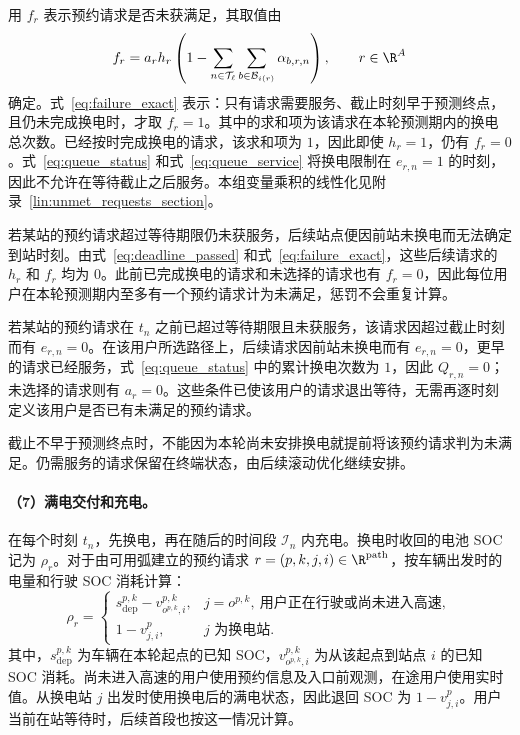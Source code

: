 用 $f_r$ 表示预约请求是否未获满足，其取值由
\begin{equation}
f_r=a_rh_r\left(
1-\sum_{n\in\mathcal T_\ell}
\sum_{b\in\mathcal B_{i(r)}}\alpha_{b,r,n}
\right),\qquad r\in\R^A
\label{eq:failure_exact}
\end{equation}
确定。式~\eqref{eq:failure_exact} 表示：只有请求需要服务、截止时刻早于预测终点，且仍未完成换电时，才取 $f_r=1$。其中的求和项为该请求在本轮预测期内的换电总次数。已经按时完成换电的请求，该求和项为 $1$，因此即使 $h_r=1$，仍有 $f_r=0$。式~\eqref{eq:queue_status} 和式~\eqref{eq:queue_service} 将换电限制在 $e_{r,n}=1$ 的时刻，因此不允许在等待截止之后服务。本组变量乘积的线性化见附录~\ref{lin:unmet_requests_section}。

若某站的预约请求超过等待期限仍未获服务，后续站点便因前站未换电而无法确定到站时刻。由式~\eqref{eq:deadline_passed} 和式~\eqref{eq:failure_exact}，这些后续请求的 $h_r$ 和 $f_r$ 均为 $0$。此前已完成换电的请求和未选择的请求也有 $f_r=0$，因此每位用户在本轮预测期内至多有一个预约请求计为未满足，惩罚不会重复计算。

若某站的预约请求在 $t_n$ 之前已超过等待期限且未获服务，该请求因超过截止时刻而有 $e_{r,n}=0$。在该用户所选路径上，后续请求因前站未换电而有 $e_{r,n}=0$，更早的请求已经服务，式~\eqref{eq:queue_status} 中的累计换电次数为 $1$，因此 $Q_{r,n}=0$；未选择的请求则有 $a_r=0$。这些条件已使该用户的请求退出等待，无需再逐时刻定义该用户是否已有未满足的预约请求。

截止不早于预测终点时，不能因为本轮尚未安排换电就提前将该预约请求判为未满足。仍需服务的请求保留在终端状态，由后续滚动优化继续安排。

\paragraph{（7）满电交付和充电。}
在每个时刻 $t_n$，先换电，再在随后的时间段 $\mathcal I_n$ 内充电。换电时收回的电池 SOC 记为 $\rho_r$。对于由可用弧建立的预约请求 $r=(p,k,j,i)\in\R^{\mathrm{path}}$，按车辆出发时的电量和行驶 SOC 消耗计算：
\[
\rho_r=
\begin{cases}
s_{\mathrm{dep}}^{p,k}-v_{o^{p,k},i}^{p,k},&j=o^{p,k},\ \text{用户正在行驶或尚未进入高速},\\
1-v_{j,i}^{p},&j\text{ 为换电站}.
\end{cases}
\]
其中，$s_{\mathrm{dep}}^{p,k}$ 为车辆在本轮起点的已知 SOC，$v_{o^{p,k},i}^{p,k}$ 为从该起点到站点 $i$ 的已知 SOC 消耗。尚未进入高速的用户使用预约信息及入口前观测，在途用户使用实时值。从换电站 $j$ 出发时使用换电后的满电状态，因此退回 SOC 为 $1-v_{j,i}^{p}$。用户当前在站等待时，后续首段也按这一情况计算。

